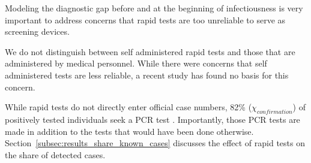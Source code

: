 Modeling the diagnostic gap before and at the beginning of infectiousness is very
important to address concerns that rapid tests are too unreliable to serve as screening
devices.

We do not distinguish between self administered rapid tests and those that are
administered by medical personnel. While there were concerns that self administered
tests are less reliable, a recent study has found no basis for this
concern.

While rapid tests do not directly enter official case numbers, 82\%
($\chi_{confirmation}$) of positively tested individuals seek a PCR test
\citep{Betsch2021}.
Importantly, those PCR tests are made in addition to the tests that would have been done
otherwise. Section~\ref{subsec:results_share_known_cases} discusses the effect of rapid
tests on the share of detected cases.

